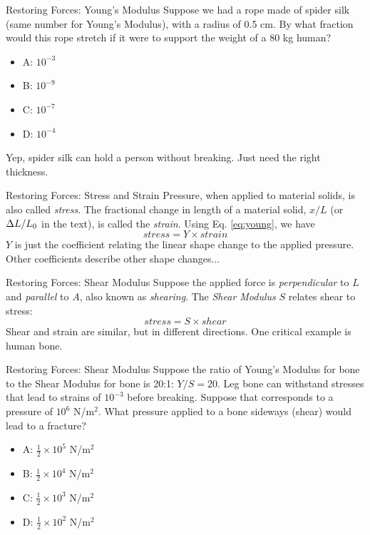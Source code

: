\documentclass{beamer}
\begin{document}
\begin{frame}{Restoring Forces: Young's Modulus}
Suppose we had a rope made of spider silk (same number for Young's Modulus), with a radius of 0.5 cm.  By what fraction would this rope stretch if it were to support the weight of a 80 kg human?
\begin{itemize}
\item A: $10^{-3}$
\item B: $10^{-9}$
\item C: $10^{-7}$
\item D: $10^{-4}$
\end{itemize}
Yep, spider silk can hold a person without breaking.  Just need the right thickness.
\end{frame}

\begin{frame}{Restoring Forces: Stress and Strain}
Pressure, when applied to material solids, is also called \textit{stress}.  The fractional change in length of a material solid, $x/L$ (or $\Delta L/L_{\rm 0}$ in the text), is called the \textit{strain}.  Using Eq. \ref{eq:young}, we have
\begin{equation}
stress = Y \times strain
\end{equation}
$Y$ is just the coefficient relating the linear shape change to the applied pressure.  Other coefficients describe other shape changes...
\end{frame}

\begin{frame}{Restoring Forces: Shear Modulus}
Suppose the applied force is \textit{perpendicular} to $L$ and \textit{parallel} to $A$, also known as \textit{shearing}.  The \textit{Shear Modulus} $S$ relates shear to stress: \\
\begin{equation}
stress = S \times shear
\end{equation}
Shear and strain are similar, but in different directions.  One critical example is human bone.
\end{frame}

\begin{frame}{Restoring Forces: Shear Modulus}
Suppose the ratio of Young's Modulus for bone to the Shear Modulus for bone is 20:1: $Y/S = 20$.  Leg bone can withstand stresses that lead to strains of $10^{-3}$ before breaking.  Suppose that corresponds to a pressure of $10^6$ N/m$^2$.  What pressure applied to a bone sideways (shear) would lead to a fracture?
\begin{itemize}
\item A: $\frac{1}{2} \times 10^{5}$ N/m$^2$
\item B: $\frac{1}{2} \times 10^{4}$ N/m$^2$
\item C: $\frac{1}{2} \times 10^{3}$ N/m$^2$
\item D: $\frac{1}{2} \times 10^{2}$ N/m$^2$
\end{itemize}
\end{frame}
\end{document}
